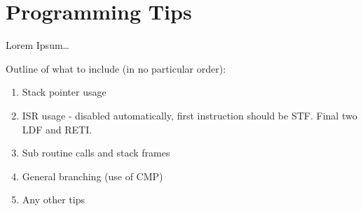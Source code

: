 
\section{Programming Tips}
Lorem Ipsum\dots
{}

Outline of what to include (in no particular order):
\begin{enumerate}
\item Stack pointer usage
\item ISR usage - disabled automatically, first instruction should be STF. Final two LDF and RETI.
\item Sub routine calls and stack frames
\item General branching (use of CMP)
\item Any other tips
\end{enumerate}
